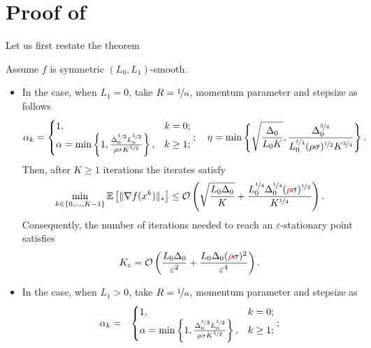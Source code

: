 \documentclass{article}
\begin{document}
\section{Proof of }
Let us first restate the theorem 
\begin{theorem}
    Assume $f$ is symmetric $(L_0, L_1)$-smooth. 
    \begin{itemize}
        \item In the case, when $L_1= 0$, take $R = \nicefrac{1}{\alpha}$, momentum parameter and stepsize as follows 
        \begin{equation*}
            \alpha_k = \begin{cases}
                1,& k = 0;\\
                \alpha = \min\left\{1, \frac{\Delta_0^{\nicefrac{1}{2}}L_0^{\nicefrac{1}{2}}}{\rho\sigma K^{\nicefrac{1}{2}}}\right\},& k \geq 1;
            \end{cases};\quad \eta = \min\left\{\sqrt{\frac{\Delta_0}{L_0 K}}, \frac{\Delta_0^{\nicefrac{3}{4}}}{ L_0^{\nicefrac{1}{4}}(\rho\sigma)^{\nicefrac{1}{2}} K^{\nicefrac{3}{4}}}\right\}.
        \end{equation*}
        Then, after $K \geq 1$ iterations the iterates satisfy 
        \begin{equation*}
            \min_{k \in \{0,\dots, K-1\}} {\mathbb{E}}\left[\|\nabla f(x^k)\|_*\right] \leq \mathcal{O}\left(\sqrt{\frac{L_0\Delta_0}{K}} + \frac{L_0^{\nicefrac{1}{4}}\Delta_0^{\nicefrac{1}{4}}({\color{red} \rho}\sigma)^{\nicefrac{1}{2}}}{K^{\nicefrac{1}{4}}}\right).
    \end{equation*}
        Consequently, the number of iterations needed to reach an $\varepsilon$-stationary point satisfies
        \begin{equation*}
            K_{\varepsilon} = \mathcal{O}\left(\frac{L_0\Delta_0 }{\varepsilon^2} + \frac{L_0\Delta_0({\color{red}\rho }\sigma)^2}{\varepsilon^4}\right).
        \end{equation*}
        \item In the case, when $L_1 >0$, take $R  = \nicefrac{1}{\alpha}$, momentum parameter and stepsize as \begin{eqnarray*}
            \alpha_k &=& \begin{cases}
                1,& k = 0;\\
                \alpha = \min\left\{1, \frac{\Delta_0^{\nicefrac{1}{2}}L_0^{\nicefrac{1}{2}}}{\rho\sigma K^{\nicefrac{1}{2}}}\right\},& k \geq 1;
            \end{cases};\\

\end{eqnarray*}
\end{itemize}
\end{theorem}
\end{document}
